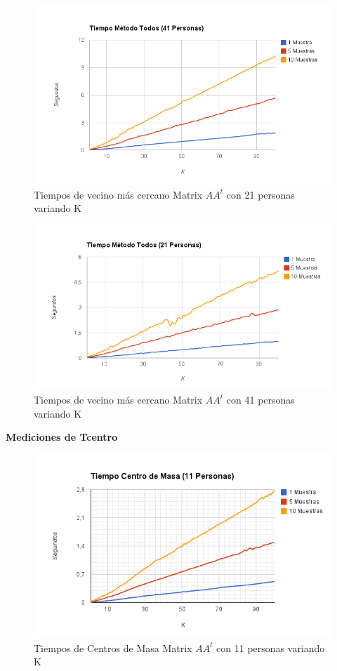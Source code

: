 \begin{figure}[H]
\includegraphics[width=1\textwidth]{img/imagef5.png}
     \caption{Tiempos de vecino más cercano Matrix $AA^t$ con 21 personas variando K}
\end{figure}

\begin{figure}[H]
\includegraphics[width=1\textwidth]{img/imagef6.png}
     \caption{Tiempos de vecino más cercano Matrix $AA^t$ con 41 personas variando K}
\end{figure}


\textbf{Mediciones de Tcentro }

\begin{figure}[H]
\includegraphics[width=1\textwidth]{img/imagef7.png}
     \caption{Tiempos de Centros de Masa Matrix $AA^t$ con 11 personas variando K}
\end{figure}

